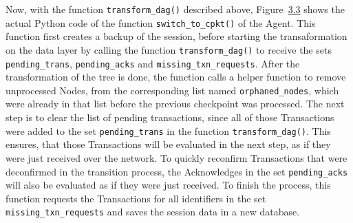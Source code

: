 Now, with the function \texttt{transform\_dag()} described above, Figure~\hyperref[fig:code_switch]{3.3} shows the actual Python code of the function \texttt{switch\_to\_cpkt()} of the Agent. 
This function first creates a backup of the session, before starting the transaformation on the data layer by calling the function \texttt{transform\_dag()} to receive the sets \texttt{pending\_trans}, \texttt{pending\_acks} and \texttt{missing\_txn\_requests}. After the transformation of the tree is done, the function calls a helper function to remove unprocessed Nodes, from the corresponding list named \texttt{orphaned\_nodes}, which were already in that list before the previous checkpoint was processed.
The next step is to clear the list of pending transactions, since all of those Transactions were added to the set \texttt{pending\_trans} in the function \texttt{transform\_dag()}. This ensures, that those Transactions will be evaluated in the next step, as if they were just received over the network. To quickly reconfirm Transactions that were deconfirmed in the transition process, the Acknowledges in the set \texttt{pending\_acks} will also be evaluated as if they were just received. To finish the process, this function requests the Transactions for all identifiers in the set \texttt{missing\_txn\_requests} and saves the session data in a new database.





























